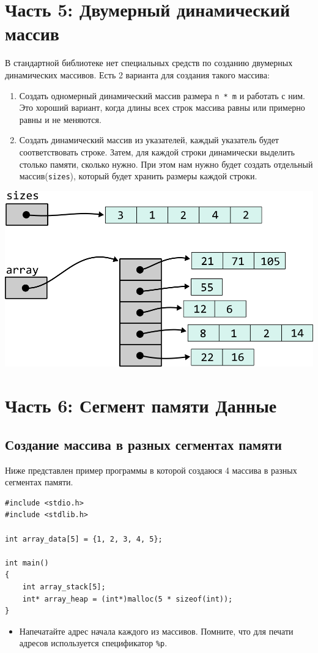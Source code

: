\documentclass{article}
\begin{document}
\section*{Часть 5: Двумерный динамический массив}
В стандартной библиотеке нет специальных средств по созданию
двумерных динамических массивов. Есть 2 варианта для создания
такого массива:
\begin{enumerate}
\item Создать одномерный динамический массив размера \texttt{n * m} и работать с ним.
Это хороший вариант, когда длины всех строк массива равны или примерно равны и не меняются.
\item Создать динамический массив из указателей, каждый указатель будет 
соответствовать строке. Затем, для каждой строки динамически выделить столько памяти,
сколько нужно. При этом нам нужно будет создать отдельный массив(\texttt{sizes}), который будет хранить
размеры каждой строки.
\end{enumerate}
\begin{center}
\includegraphics[scale=1]{../images/pointer_schemes/two_dim_dynamic_array.png}
\end{center}

\newpage
\section*{Часть 6: Сегмент памяти Данные}
\subsection*{Создание массива в разных сегментах памяти}
Ниже представлен пример программы в которой создаюся 4 массива в разных сегментах памяти.
\begin{lstlisting}
#include <stdio.h>
#include <stdlib.h>

int array_data[5] = {1, 2, 3, 4, 5};

int main() 
{
    int array_stack[5];
    int* array_heap = (int*)malloc(5 * sizeof(int));
}
\end{lstlisting}
\begin{itemize}
\item Напечатайте адрес начала каждого из массивов. Помните, что для печати адресов используется спецификатор \texttt{\%p}.
\end{itemize}
\end{document}
